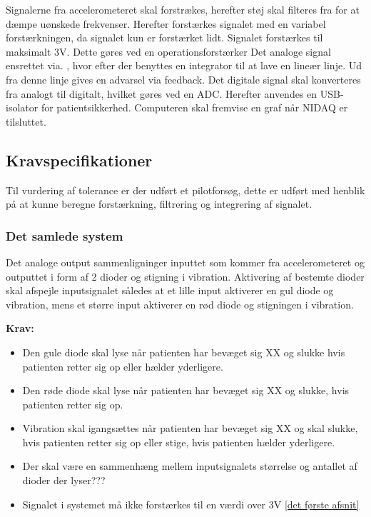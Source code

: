 Signalerne fra accelerometeret skal forstrækes, herefter støj skal filteres fra for at dæmpe uønskede frekvenser. Herefter forstærkes signalet med en variabel forstærkningen, da signalet kun er forstærket lidt. Signalet forstærkes til maksimalt 3V. Dette gøres ved en operationsforstærker  Det analoge signal ensrettet via. , hvor efter der benyttes en integrator til at lave en lineær linje. Ud fra denne linje gives en advarsel via feedback. Det digitale signal skal konverteres fra analogt til digitalt, hvilket gøres ved en ADC.  Herefter anvendes en USB-isolator for patientsikkerhed. Computeren skal fremvise en graf når NIDAQ er tilsluttet. 

\subsection{Kravspecifikationer}
Til vurdering af tolerance er der udført et pilotforsøg, dette er udført med henblik på at kunne beregne forstærkning, filtrering og integrering af signalet. 

\subsubsection{Det samlede system}
Det analoge output sammenligninger inputtet som kommer fra accelerometeret og outputtet i form af 2 dioder og stigning i vibration. Aktivering af bestemte dioder skal afspejle inputsignalet således at et lille input aktiverer en gul diode og vibration, mens et større input aktiverer en rød diode og stigningen i vibration. 

\textbf{Krav:}
\begin{itemize}
\item Den gule diode skal lyse når patienten har bevæget sig XX og slukke hvis patienten retter sig op eller hælder yderligere.
\item Den røde diode skal lyse når patienten har bevæget sig XX og slukke, hvis patienten retter sig op.
\item Vibration skal igangsættes når patienten har bevæget sig XX og skal slukke, hvis patienten retter sig op eller stige, hvis patienten hælder yderligere.
\item Der skal være en sammenhæng mellem inputsignalets størrelse og antallet af dioder der lyser???
\item Signalet i systemet må ikke forstærkes til en værdi over 3V \ref{det første afsnit}
\end{itemize}

